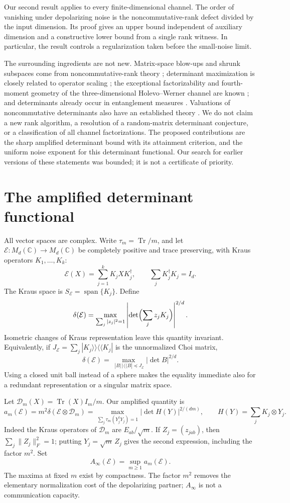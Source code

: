 \documentclass[11pt,a4paper]{article}
\theoremstyle{remark}\newtheorem{remark}[theorem]{Remark}
\newcommand{\Tr}{\operatorname{Tr}}
\newcommand{\Span}{\operatorname{span}}
\newcommand{\D}{\mathcal D}
\newcommand{\E}{\mathcal E}
\newcommand{\M}{M}
\newcommand{\Ainf}{A_\infty}
\newcommand{\abs}[1]{\left\lvert#1\right\rvert}
\begin{document}
Our second result applies to every finite-dimensional channel. The order of vanishing under depolarizing noise is the noncommutative-rank defect divided by the input dimension. Its proof gives an upper bound independent of auxiliary dimension and a constructive lower bound from a single rank witness. In particular, the result controls a regularization taken before the small-noise limit.

The surrounding ingredients are not new. Matrix-space blow-ups and shrunk subspaces come from noncommutative-rank theory \cite{DM,IQS}; determinant maximization is closely related to operator scaling \cite{GGOW}; the exceptional factorizability and fourth-moment geometry of the three-dimensional Holevo--Werner channel are known \cite{HM}; and determinants already occur in entanglement measures \cite{Gour}. Valuations of noncommutative determinants also have an established theory \cite{HIOS}. We do not claim a new rank algorithm, a resolution of a random-matrix determinant conjecture, or a classification of all channel factorizations. The proposed contributions are the sharp amplified determinant bound with its attainment criterion, and the uniform noise exponent for this determinant functional. Our search for earlier versions of these statements was bounded; it is not a certificate of priority.

\section{The amplified determinant functional}
All vector spaces are complex. Write \(\tau_m=\Tr/m\), and let
\(\E:\M_d(\mathbb C)\to\M_d(\mathbb C)\) be completely positive and trace preserving, with Kraus operators \(K_1,\ldots,K_k\):
\[
 \E(X)=\sum_{j=1}^kK_jXK_j^\dagger,\qquad
 \sum_jK_j^\dagger K_j=I_d .
\]
The Kraus space is \(S_\E=\Span\{K_j\}\).
Define
\begin{equation}\label{eq:delta}
 \delta(\E)=\max_{\sum_j|z_j|^2=1}
       \abs{\det\Bigl(\sum_jz_jK_j\Bigr)}^{2/d}.
\end{equation}
Isometric changes of Kraus representation leave this quantity invariant. Equivalently, if \(J_\E=\sum_j|K_j\rangle\!\rangle\langle\!\langle K_j|\) is the unnormalized Choi matrix,
\[
 \delta(\E)=
 \max_{\;|B\rangle\!\rangle\langle\!\langle B|\preceq J_\E}
 |\det B|^{2/d}.
\]
Using a closed unit ball instead of a sphere makes the equality immediate also for a redundant representation or a singular matrix space.

Let \(\D_m(X)=\Tr(X)I_m/m\). Our amplified quantity is
\begin{equation}\label{eq:am}
 a_m(\E)=m^2\delta(\E\otimes\D_m)
   =\max_{\sum_j\tau_m(Y_j^\dagger Y_j)=1}
       \abs{\det H(Y)}^{2/(dm)},\qquad
 H(Y)=\sum_jK_j\otimes Y_j .
\end{equation}
Indeed the Kraus operators of \(\D_m\) are \(E_{ab}/\sqrt m\).
If \(Z_j=(z_{jab})\), then \(\sum_j\|Z_j\|_F^2=1\);
putting \(Y_j=\sqrt m\,Z_j\) gives the second expression, including the factor \(m^2\).
Set
\[
 \Ainf(\E)=\sup_{m\ge1}a_m(\E).
\]
The maxima at fixed \(m\) exist by compactness. The factor \(m^2\) removes the elementary normalization cost of the depolarizing partner; \(\Ainf\) is not a communication capacity.
\end{document}
